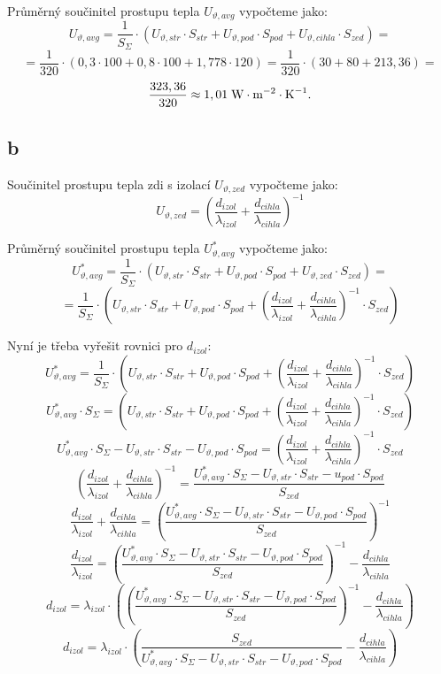 \documentclass{article}
\begin{document}
Průměrný součinitel prostupu tepla $U_{\vartheta,avg}$ vypočteme jako:
$$
    U_{\vartheta,avg} = \frac{1}{S_{\Sigma}} \cdot (U_{\vartheta,str} \cdot S_{str} + U_{\vartheta,pod} \cdot S_{pod} + U_{\vartheta,cihla} \cdot S_{zed}) =
$$
$$
    = \frac{1}{320} \cdot \left( 0,3 \cdot 100 + 0,8 \cdot 100 + 1,778 \cdot 120 \right) = \frac{1}{320} \cdot (30 + 80 + 213,36) =
$$
$$
    \frac{323,36}{320} \approx 1,01 \; \textrm{W} \cdot \textrm{m}^{-2} \cdot \textrm{K}^{-1}.
$$



\subsection{b}
Součinitel prostupu tepla zdi s izolací $U_{\vartheta,zed}$ vypočteme jako:
$$
    U_{\vartheta,zed} = \left( \frac{d_{izol}}{\lambda_{izol}} + \frac{d_{cihla}}{\lambda_{cihla}} \right)^{-1}
$$

Průměrný součinitel prostupu tepla $U_{\vartheta,avg}^{*}$ vypočteme jako:
$$
    U_{\vartheta,avg}^{*} = \frac{1}{S_{\Sigma}} \cdot (U_{\vartheta,str} \cdot S_{str} + U_{\vartheta,pod} \cdot S_{pod} + U_{\vartheta,zed} \cdot S_{zed}) =
$$
$$
    = \frac{1}{S_{\Sigma}} \cdot (U_{\vartheta,str} \cdot S_{str} + U_{\vartheta,pod} \cdot S_{pod} + \left( \frac{d_{izol}}{\lambda_{izol}} + \frac{d_{cihla}}{\lambda_{cihla}} \right)^{-1} \cdot S_{zed})
$$

Nyní je třeba vyřešit rovnici pro $d_{izol}$:
$$
    U_{\vartheta,avg}^{*} = \frac{1}{S_{\Sigma}} \cdot (U_{\vartheta,str} \cdot S_{str} + U_{\vartheta,pod} \cdot S_{pod} + \left( \frac{d_{izol}}{\lambda_{izol}} + \frac{d_{cihla}}{\lambda_{cihla}} \right)^{-1} \cdot S_{zed})
$$
$$
    U_{\vartheta,avg}^{*} \cdot S_{\Sigma} =  (U_{\vartheta,str} \cdot S_{str} + U_{\vartheta,pod} \cdot S_{pod} + \left( \frac{d_{izol}}{\lambda_{izol}} + \frac{d_{cihla}}{\lambda_{cihla}} \right)^{-1} \cdot S_{zed})
$$
$$
    U_{\vartheta,avg}^{*} \cdot S_{\Sigma} - U_{\vartheta,str} \cdot S_{str} - U_{\vartheta,pod} \cdot S_{pod} = \left( \frac{d_{izol}}{\lambda_{izol}} + \frac{d_{cihla}}{\lambda_{cihla}} \right)^{-1} \cdot S_{zed}
$$
$$
    \left( \frac{d_{izol}}{\lambda_{izol}} + \frac{d_{cihla}}{\lambda_{cihla}} \right)^{-1} = \frac{U_{\vartheta,avg}^{*} \cdot S_{\Sigma} - U_{\vartheta,str} \cdot S_{str} - u_{pod} \cdot S_{pod}}{S_{zed}}
$$
$$
    \frac{d_{izol}}{\lambda_{izol}} + \frac{d_{cihla}}{\lambda_{cihla}} = \left( \frac{U_{\vartheta,avg}^{*} \cdot S_{\Sigma} - U_{\vartheta,str} \cdot S_{str} - U_{\vartheta,pod} \cdot S_{pod}}{S_{zed}} \right)^{-1}
$$
$$
    \frac{d_{izol}}{\lambda_{izol}} = \left( \frac{U_{\vartheta,avg}^{*} \cdot S_{\Sigma} - U_{\vartheta,str} \cdot S_{str} - U_{\vartheta,pod} \cdot S_{pod}}{S_{zed}} \right)^{-1} - \frac{d_{cihla}}{\lambda_{cihla}}
$$
$$
    d_{izol} = \lambda_{izol} \cdot \left( \left( \frac{U_{\vartheta,avg}^{*} \cdot S_{\Sigma} - U_{\vartheta,str} \cdot S_{str} - U_{\vartheta,pod} \cdot S_{pod}}{S_{zed}} \right)^{-1} - \frac{d_{cihla}}{\lambda_{cihla}} \right)
$$
$$
    d_{izol} = \lambda_{izol} \cdot \left( \frac{S_{zed}}{U_{\vartheta,avg}^{*} \cdot S_{\Sigma} - U_{\vartheta,str} \cdot S_{str} - U_{\vartheta,pod} \cdot S_{pod}} - \frac{d_{cihla}}{\lambda_{cihla}} \right)
$$
\end{document}

